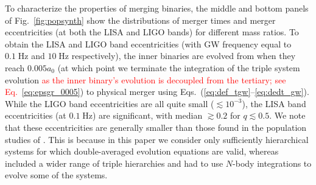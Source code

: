 \documentclass[
        fleqn,
        usenatbib,
    ]{mnras}
\begin{document}
To characterize the properties of merging binaries, the middle and bottom panels
of Fig.~\ref{fig:popsynth} show the distributions of merger times and merger
eccentricities (at both the LISA and LIGO bands) for different mass ratios. To
obtain the LISA and LIGO band eccentricities (with GW frequency equal to
$0.1\;\mathrm{Hz}$ and $10\;\mathrm{Hz}$ respectively), the inner binaries are
evolved from when they reach $0.005 a_0$ (at which point we terminate the
integration of the triple system evolution \textcolor{red}{as the inner binary's
evolution is decoupled from the tertiary; see Eq.~\ref{eq:epsgr_0005}}) to
physical merger using Eqs.~(\ref{eq:def_tgw}--\ref{eq:dedt_gw}). While the LIGO
band eccentricities are all quite small ($\lesssim 10^{-3}$), the LISA band
eccentricities (at $0.1 \;\mathrm{Hz}$) are significant, with median $\gtrsim
0.2$ for $q\lesssim 0.5$. We note that these eccentricities are generally
smaller than those found in the population studies of \citet{LL19}. This is
because in this paper we consider only sufficiently hierarchical systems for
which double-averaged evolution equations are valid, whereas \citet{LL19}
included a wider range of triple hierarchies and had to use $N$-body
integrations to evolve some of the systems.
\end{document}
